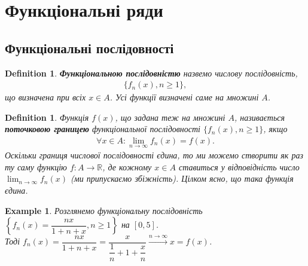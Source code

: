 \documentclass[a4paper, 10pt]{article}
\def\huge{\displaystyle}
\theoremstyle{theoremdd}
\theoremstyle{theoremdd}
\theoremstyle{theoremdd}
\newtheorem{definition}[theorem]{Definition}
\theoremstyle{theoremdd}
\theoremstyle{theoremdd}
\newtheorem{example}[theorem]{Example}
\theoremstyle{theoremdd}
\theoremstyle{theoremdd}
\theoremstyle{theoremdd}
\theoremstyle{theoremdd}
\begin{document}
\section{Функціональні ряди}
\subsection{Функціональні послідовності}
\begin{definition}
\textbf{Функціональною послідовністю} назвемо числову послідовність,
\begin{align*}
\{f_n(x), n \geq 1 \},
\end{align*}
що визначена при всіх $x \in A$. Усі функції визначені саме на множині $A$.
\end{definition}

\begin{definition}
Функція $f(x)$, що задана теж на множині $A$, називається \textbf{поточковою границею} функціональної послідовності $\{f_n(x), n \geq 1\}$, якщо
\begin{align*}
\forall x \in A: \lim_{n \to \infty} f_n(x) = f(x).
\end{align*}
Оскільки границя числової послідовності єдина, то ми можемо створити як раз ту саму функцію $f \colon A \to \mathbb{R}$, де кожному $x \in A$ ставиться у відповідність число $\displaystyle\lim_{n \to \infty} f_n(x)$ (ми припускаємо збіжність). Цілком ясно, що така функція єдина.
\end{definition}

\begin{example}
Розглянемо функціональну послідовність $\left\{ f_n(x) = \dfrac{nx}{1+n+x}, n \geq 1 \right\}$ на $[0,5]$.\\
Тоді $f_n(x) = \dfrac{nx}{1+n+x} = \dfrac{x}{\dfrac{1}{n}+ 1 + \dfrac{x}{n}} \overset{n \to \infty}{\longrightarrow} x = f(x)$.
\end{example}
\end{document}
